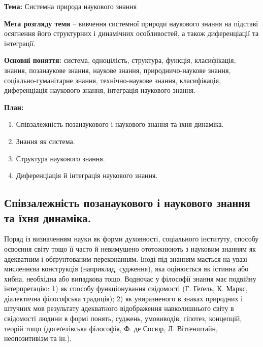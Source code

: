 \textbf{Тема:} Системна природа наукового знання

\textbf{Мета розгляду теми} – вивчення системної природи наукового знання на
підставі осягнення його структурних і динамічних особливостей, а також
диференціації та інтеграції.

\textbf{Основні поняття:} система, одноцілість, структура, функція, класифікація,
знання, позанаукове знання, наукове знання, природничо-наукове знання,
соціально-гуманітар\-не знання, технічно-наукове знання, класифікація,
диференціація наукового знання, інтеграція наукового знання.

\textbf{План:}
\begin{enumerate}
	\item Співзалежність позанаукового і наукового знання та їхня динаміка.

	\item Знання як система.

	\item Структура наукового знання.

	\item Диференціація й інтеграція наукового знання.
\end{enumerate}

\subsection{Співзалежність позанаукового і наукового знання та їхня динаміка.}
Поряд із визначенням науки як форми духовності, соціального інституту,
способу освоєння світу тощо її часто й невимушено ототожнюють з науковим
знанням як адекватним і обґрунтованим переконанням. Іноді під знанням
мається на увазі мисленнєва конструкція (наприклад, судження), яка
оцінюється як істинна або хибна, необхідна або випадкова тощо. Водночас у
філософії знання має подвійну інтерпретацію: 1) як способу функціонування
свідомості (Г. Геґель, К. Маркс, діалектична філософська традиція); 2) як
увиразненого в знаках природних і штучних мов результату адекватного
відображення навколишнього світу в свідомості людини в формі понять,
суджень, умовиводів, гіпотез, концепцій, теорій тощо (догеґелівська філософія,
Ф. де Сосюр, Л. Вітґенштайн, неопозитивізм та ін.).

